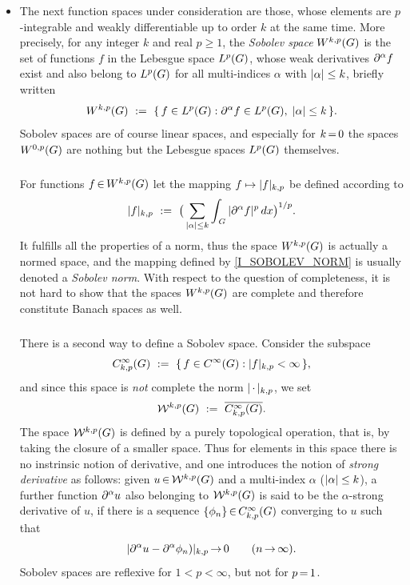 \documentclass[11pt,twoside]{article}
\begin{document}
\begin{itemize}[leftmargin=12pt,itemsep=5pt]
\begin{itemize}[leftmargin=17pt]
\item[(a)] The next function spaces under consideration are those,
whose elements are $p$-integrable and weakly differentiable up to order $k$
at the same time.
More precisely,
for any integer $k$ and real $p \geq 1$,
the \textit{Sobolev space} $W^{k,p}(G)$ is the set
of functions $f$ in the Lebesgue space $L^p(G)$,
whose weak derivatives $\partial^{\alpha} f$ exist and also belong to $L^p(G)$
for all multi-indices $\alpha$ with $ \abs{\alpha} \leq k$,
briefly written
\[
\SobW
\, \eqdef \,
\{\,f \in \Lp: \PA f \in \Lp, \; \abs{\alpha} \leq k \, \}.
\]
Sobolev spaces are of course linear spaces,
and especially for $k {\,=\,} 0$
the spaces $W^{0,p}(G)$ are nothing but the Lebesgue spaces $L^p(G)$ themselves.

\subparagraph{} %
For functions $f {\,\in\,} W^{k,p}(G)$ let the mapping $f \mapsto \abs{f} _{k,p}$
be defined according to
\begin{equation}\label{I_SOBOLEV_NORM}
\abs{f} _{k,p} \, \eqdef \,
\big(
\sum_{\abs{\alpha } \leq k}
\int_{\,\G} \, \abs{\PA f} ^p \, dx
\big) ^{1/p}.
\end{equation}
It fulfills all the properties of a norm,
thus the space $W^{k,p}(G)$ is actually a normed space,
and the mapping defined by \eqref{I_SOBOLEV_NORM}
is usually denoted a \textit{Sobolev norm}.
With respect to the question of completeness,
it is not hard to show that
the spaces $W^{k,p}(G)$ are complete
and therefore constitute Banach spaces as well.

\subparagraph{} %
There is a second way to define a Sobolev space.
Consider the subspace
\[
C_{k,p}^{\infty}(\G) \, \eqdef \, \{\, f \in \SF: \abs{f} _{k,p} < \infty \,\},
\]
and since this space is \textit{not} complete
{\wrt} the norm $\abs{\,\cdot\,} _{k,p}$,
we set
\[
{\mathcal{W}}^{k,p}(G) \, \,:=\, \, \overline{C_{k,p}^{\infty}(G)}.
\]
The space ${\mathcal{W}}^{k,p}(G)$ is defined by a purely topological operation,
that is,
by taking the closure of a smaller space.
Thus for elements in this space there is no instrinsic notion of derivative,
and one introduces the notion of \textit{strong derivative} as follows:
given $u {\,\in\,} {\mathcal{W}}^{k,p}(G)$
and a multi-index $\alpha$ ($\abs{\alpha} \leq k$),
a further function $\partial^{\alpha} u$ also belonging to ${\mathcal{W}}^{k,p}(G)$
is said to be the $\alpha$-strong derivative of $u$,
if there is a sequence $\{\phi_n\} {\,\in\,} C_{k,p}^{\infty}(G)$
converging to $u$ such that
\[
\abs{\PA u - \PA \phi_n)} _{k,p} \xto 0 \quad \quad (n \xto \infty).
\]
Sobolev spaces are reflexive for $1 < p < \infty$,
but not for $p {\,=\,} 1$.


\end{itemize}
\end{itemize}
\end{document}
